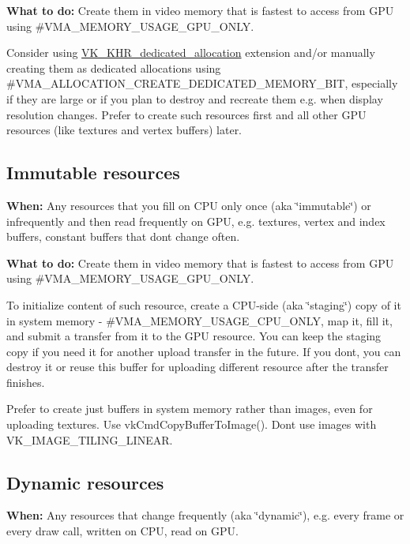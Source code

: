 {\bfseries What to do\+:} Create them in video memory that is fastest to access from G\+PU using \#\+V\+M\+A\+\_\+\+M\+E\+M\+O\+R\+Y\+\_\+\+U\+S\+A\+G\+E\+\_\+\+G\+P\+U\+\_\+\+O\+N\+LY.

Consider using \hyperlink{vk_khr_dedicated_allocation}{V\+K\+\_\+\+K\+H\+R\+\_\+dedicated\+\_\+allocation} extension and/or manually creating them as dedicated allocations using \#\+V\+M\+A\+\_\+\+A\+L\+L\+O\+C\+A\+T\+I\+O\+N\+\_\+\+C\+R\+E\+A\+T\+E\+\_\+\+D\+E\+D\+I\+C\+A\+T\+E\+D\+\_\+\+M\+E\+M\+O\+R\+Y\+\_\+\+B\+IT, especially if they are large or if you plan to destroy and recreate them e.\+g. when display resolution changes. Prefer to create such resources first and all other G\+PU resources (like textures and vertex buffers) later.\hypertarget{usage_patterns_usage_patterns_simple_immutable_resources}{}\subsection{Immutable resources}\label{usage_patterns_usage_patterns_simple_immutable_resources}
{\bfseries When\+:} Any resources that you fill on C\+PU only once (aka \char`\"{}immutable\char`\"{}) or infrequently and then read frequently on G\+PU, e.\+g. textures, vertex and index buffers, constant buffers that don\textquotesingle{}t change often.

{\bfseries What to do\+:} Create them in video memory that is fastest to access from G\+PU using \#\+V\+M\+A\+\_\+\+M\+E\+M\+O\+R\+Y\+\_\+\+U\+S\+A\+G\+E\+\_\+\+G\+P\+U\+\_\+\+O\+N\+LY.

To initialize content of such resource, create a C\+P\+U-\/side (aka \char`\"{}staging\char`\"{}) copy of it in system memory -\/ \#\+V\+M\+A\+\_\+\+M\+E\+M\+O\+R\+Y\+\_\+\+U\+S\+A\+G\+E\+\_\+\+C\+P\+U\+\_\+\+O\+N\+LY, map it, fill it, and submit a transfer from it to the G\+PU resource. You can keep the staging copy if you need it for another upload transfer in the future. If you don\textquotesingle{}t, you can destroy it or reuse this buffer for uploading different resource after the transfer finishes.

Prefer to create just buffers in system memory rather than images, even for uploading textures. Use {\ttfamily vk\+Cmd\+Copy\+Buffer\+To\+Image()}. Dont use images with {\ttfamily V\+K\+\_\+\+I\+M\+A\+G\+E\+\_\+\+T\+I\+L\+I\+N\+G\+\_\+\+L\+I\+N\+E\+AR}.\hypertarget{usage_patterns_usage_patterns_dynamic_resources}{}\subsection{Dynamic resources}\label{usage_patterns_usage_patterns_dynamic_resources}
{\bfseries When\+:} Any resources that change frequently (aka \char`\"{}dynamic\char`\"{}), e.\+g. every frame or every draw call, written on C\+PU, read on G\+PU.

